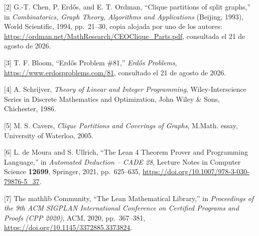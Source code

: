 \documentclass[spanish,11pt,a4paper]{article}
\begin{document}
{[}2{]} G.-T. Chen, P. Erdős, and E. T. Ordman, ``Clique partitions of
split graphs,'' in \emph{Combinatorics, Graph Theory, Algorithms and
Applications} (Beijing, 1993), World Scientific, 1994, pp.~21--30, copia
alojada por uno de los autores:
\url{https://ordman.net/MathResearch/CEOClique_Parts.pdf}, consultada el
21 de agosto de 2026.

{[}3{]} T. F. Bloom, ``Erdős Problem \#81,'' \emph{Erdős Problems},
\url{https://www.erdosproblems.com/81}, consultado el 21 de agosto de
2026.

{[}4{]} A. Schrijver, \emph{Theory of Linear and Integer Programming},
Wiley-Interscience Series in Discrete Mathematics and Optimization, John
Wiley \& Sons, Chichester, 1986.

{[}5{]} M. S. Cavers, \emph{Clique Partitions and Coverings of Graphs},
M.Math. essay, University of Waterloo, 2005.

{[}6{]} L. de Moura and S. Ullrich, ``The Lean 4 Theorem Prover and
Programming Language,'' in \emph{Automated Deduction -- CADE 28},
Lecture Notes in Computer Science \textbf{12699}, Springer, 2021,
pp.~625--635, \url{https://doi.org/10.1007/978-3-030-79876-5_37}.

{[}7{]} The mathlib Community, ``The Lean Mathematical Library,'' in
\emph{Proceedings of the 9th ACM SIGPLAN International Conference on
Certified Programs and Proofs (CPP 2020)}, ACM, 2020, pp.~367--381,
\url{https://doi.org/10.1145/3372885.3373824}.
\end{document}
